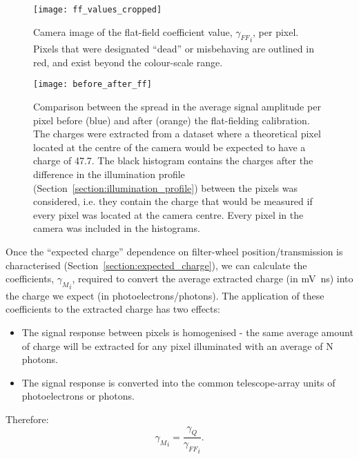 \begin{figure}
	\centering
    \texttt{[image: ff\_values\_cropped]} 
	\caption[Flat-field Coefficients]{Camera image of the flat-field coefficient value, ${\gamma_{FF}}_i$, per pixel. Pixels that were designated ``dead'' or misbehaving are outlined in red, and exist beyond the colour-scale range.}
	\label{fig:ff_values}
\end{figure}

\begin{figure}
	\centering
    \texttt{[image: before\_after\_ff]} 
	\caption[Flat-field Residuals]{Comparison between the spread in the average signal amplitude per pixel before (blue) and after (orange) the flat-fielding calibration. The charges were extracted from a dataset where a theoretical pixel located at the centre of the camera would be expected to have a charge of \SI{47.7}{\pe}. The black histogram contains the charges after the difference in the illumination profile (Section~\ref{section:illumination_profile}) between the pixels was considered, i.e. they contain the charge that would be measured if every pixel was located at the camera centre. Every pixel in the camera was included in the histograms.}
	\label{fig:before_after_ff}
\end{figure}

Once the ``expected charge'' dependence on filter-wheel position/transmission is characterised (Section~\ref{section:expected_charge}), we can calculate the coefficients, ${\gamma_M}_i$, required to convert the average extracted charge (in \si{mV ns}) into the charge we expect (in photoelectrons/photons). The application of these coefficients to the extracted charge has two effects:
\begin{itemize}
\item The signal response between pixels is homogenised - the same average amount of charge will be extracted for any pixel illuminated with an average of N photons.
\item The signal response is converted into the common telescope-array units of photoelectrons or photons.
\end{itemize}
Therefore:
\begin{equation} \label{eq:ff}
{\gamma_M}_i = \frac{\gamma_Q}{{\gamma_{FF}}_i}.
\end{equation}


